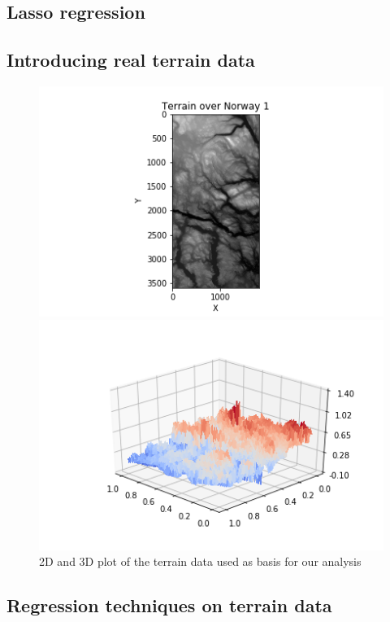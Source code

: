 \documentclass{article}
\begin{document}
\subsection{Lasso regression}

\subsection{Introducing real terrain data}
\begin{figure}
\begin{minipage}{0.48\textwidth}
\centering
\includegraphics[width=1.5\linewidth]{terrain2dplot.png}
\end{minipage}
\begin{minipage}{\textwidth}

\includegraphics[width=0.7\linewidth]{rawdataplot.png}
\end{minipage}
\caption{2D and 3D plot of the terrain data used as basis for our analysis}
\end{figure}



\subsection{Regression techniques on terrain data}
\end{document}
